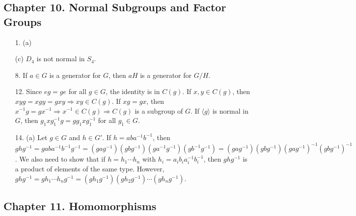 \subsection*{Chapter 10. Normal Subgroups and Factor Groups}
 
{\small
\begin{itemize}
 
\item[1.]
(a)

(c) $D_4$ is not normal in $S_4$.
 
 


 
\item[8.]
If $a \in G$ is a generator for $G$, then $aH$ is a generator for $G/H$.
 
\item[12.]
Since $eg = ge$ for all $g \in G$, the identity is in $C(g)$. If $x,
y \in C(g)$, then $xy g = x g y = g xy \Rightarrow xy \in C(g)$.  If
$x g = g x$, then $x^{-1} g = g x^{-1} \Rightarrow x^{-1} \in C(g)
\Rightarrow C(g)$ is a subgroup of $G$. If $\langle g \rangle$ is
normal in $G$, then $g_1 x g_1^{-1} g = g g_1 x g_1^{-1}$ for all $g_1
\in G$.
 
\item[14.]
(a)
Let $g \in G$ and $h \in G'$. If $h = aba^{-1}b^{-1}$, then $ghg^{-1}
= gaba^{-1}b^{-1}g^{-1} 
= (gag^{-1})(gbg^{-1})(ga^{-1}g^{-1})(gb^{-1}g^{-1}) 
= (gag^{-1})(gbg^{-1})(gag^{-1})^{-1}(gbg^{-1})^{-1}$. We also need to
show that if $h = h_1 \cdots h_n$ with $h_i = a_i b_i a_i^{-1}
b_i^{-1}$, then $ghg^{-1}$ is a product of elements of the same type.
However, $ghg^{-1} = g h_1 \cdots h_n g^{-1} =
(gh_1g^{-1})(gh_2g^{-1}) \cdots (gh_ng^{-1})$.
 
 
 
 
\end{itemize}
}

\subsection*{Chapter 11. Homomorphisms}
 
